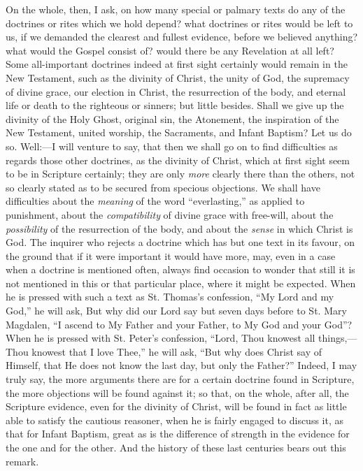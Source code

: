 On the whole, then, I ask, on how many special or palmary texts do
any of the doctrines or rites which we hold depend? what doctrines or
rites would be left to us, if we demanded the clearest and fullest
evidence, before we believed anything? what would the Gospel consist
of? would there be any Revelation at all left? Some all-important
doctrines indeed at first sight certainly would remain in the New
Testament, such as the divinity of Christ, the unity of God, the
supremacy of divine grace, our election in Christ, the resurrection of
the body, and eternal life or death to the righteous or sinners; but
little besides. Shall we give up the divinity of the Holy Ghost,
original sin, the Atonement, the inspiration of the New Testament,
united worship, the Sacraments, and Infant Baptism? Let us do so.
Well:—I will venture to say, that then we shall go on to find
difficulties as regards those other doctrines, as the divinity of
Christ, which at first sight seem to be in Scripture certainly; they
are only \emph{more} clearly there than the others, not so clearly
stated as to be secured from specious objections. We shall have
difficulties about the \emph{meaning} of the word
``everlasting,'' as applied to punishment, about the \emph{compatibility}
of divine grace with free-will, about the \emph{possibility} of the
resurrection of the body, and about the \emph{sense} in which Christ
is God. The inquirer who rejects a doctrine which has but one text in
its favour, on the ground that if it were important it would have
more, may, even in a case when a doctrine is mentioned often,
always find occasion to wonder that still it is not mentioned in this
or that particular place, where it might be expected. When he is
pressed with such a text as St. Thomas's confession, ``My Lord and
my God,'' he will ask, But why did our Lord say but seven days
before to St. Mary Magdalen, ``I ascend to My Father and your
Father, to My God and your God''? When he is pressed with St.
Peter's confession, ``Lord, Thou knowest all things,—Thou
knowest that I love Thee,'' he will ask, ``But why does Christ
say of Himself, that He does not know the last day, but only the
Father?'' Indeed, I may truly say, the more arguments there are
for a certain doctrine found in Scripture, the more objections will be
found against it; so that, on the whole, after all, the Scripture
evidence, even for the divinity of Christ, will be found in fact as
little able to satisfy the cautious reasoner, when he is fairly
engaged to discuss it, as that for Infant Baptism, great as is the
difference of strength in the evidence for the one and for the other.
And the history of these last centuries bears out this remark.

